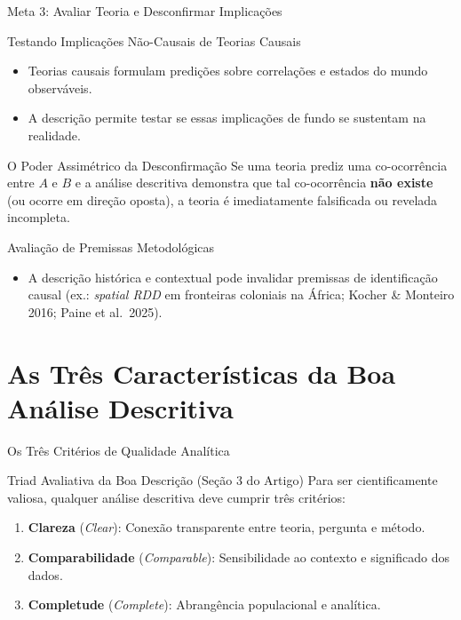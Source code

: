 \documentclass[
  ignorenonframetext,
  aspectratio=169,
  brazilian,
  t,
  10pt]{beamer}
\providecommand{\tightlist}{%
  \setlength{\itemsep}{0pt}\setlength{\parskip}{0pt}}
\begin{document}
\begin{frame}{Meta 3: Avaliar Teoria e Desconfirmar Implicações}
\protect{}\label{meta-3-avaliar-teoria-e-desconfirmar-implicauxe7uxf5es}
\begin{block}{Testando Implicações Não-Causais de Teorias Causais}
\protect{}\label{testando-implicauxe7uxf5es-nuxe3o-causais-de-teorias-causais}
\begin{itemize}
\tightlist
\item
  Teorias causais formulam predições sobre correlações e estados do
  mundo observáveis.
\item
  A descrição permite testar se essas implicações de fundo se sustentam
  na realidade.
\end{itemize}

\begin{block}{O Poder Assimétrico da Desconfirmação}
Se uma teoria prediz uma co-ocorrência entre $A$ e $B$ e a análise descritiva demonstra que tal co-ocorrência \textbf{não existe} (ou ocorre em direção oposta), a teoria é imediatamente falsificada ou revelada incompleta.
\end{block}
\end{block}

\begin{block}{Avaliação de Premissas Metodológicas}
\protect{}\label{avaliauxe7uxe3o-de-premissas-metodoluxf3gicas}
\begin{itemize}
\tightlist
\item
  A descrição histórica e contextual pode invalidar premissas de
  identificação causal (ex.: \emph{spatial RDD} em fronteiras coloniais
  na África; Kocher \& Monteiro 2016; Paine et al.~2025).
\end{itemize}
\end{block}
\end{frame}

\section{As Três Características da Boa Análise
Descritiva}\label{as-truxeas-caracteruxedsticas-da-boa-anuxe1lise-descritiva}

\begin{frame}{Os Três Critérios de Qualidade Analítica}
\protect{}\label{os-truxeas-crituxe9rios-de-qualidade-analuxedtica}
\begin{block}{Triad Avaliativa da Boa Descrição (Seção 3 do Artigo)}
Para ser cientificamente valiosa, qualquer análise descritiva deve cumprir três critérios:
\begin{enumerate}
  \item \textbf{Clareza} (\textit{Clear}): Conexão transparente entre teoria, pergunta e método.
  \item \textbf{Comparabilidade} (\textit{Comparable}): Sensibilidade ao contexto e significado dos dados.
  \item \textbf{Completude} (\textit{Complete}): Abrangência populacional e analítica.
\end{enumerate}
\end{block}
\end{frame}
\end{document}
